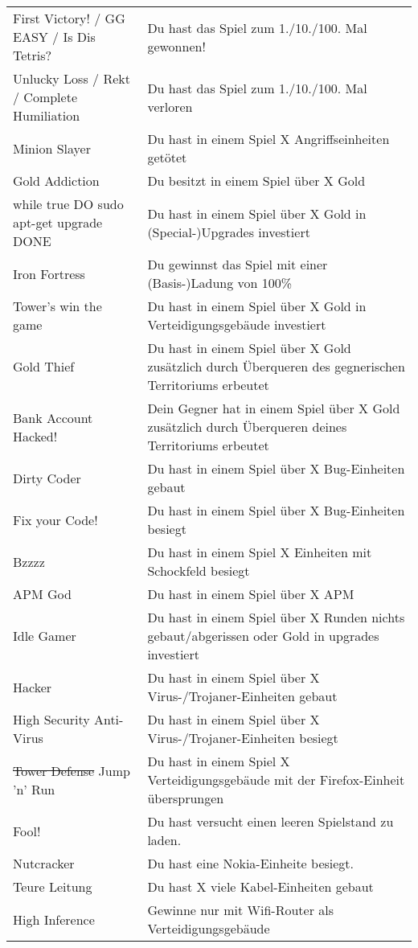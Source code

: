 \begin{table}[ht]
\begin{longtabu}{X[-1]X}
    First Victory! / GG EASY / Is Dis Tetris?
      & Du hast das Spiel zum 1./10./100. Mal gewonnen!
      	\\
    Unlucky Loss / Rekt / Complete Humiliation
    	& Du hast das Spiel zum 1./10./100. Mal verloren
    	\\
	Minion Slayer
		& Du hast in einem Spiel X Angriffseinheiten getötet
		\\
	Gold Addiction
		& Du besitzt in einem Spiel über X Gold
		\\
	while true DO sudo apt-get upgrade DONE
		& Du hast in einem Spiel über X Gold in (Special-)Upgrades investiert
		\\
	Iron Fortress
		& Du gewinnst das Spiel mit einer (Basis-)Ladung von 100\%
		\\
	Tower's win the game
		& Du hast in einem Spiel über X Gold in Verteidigungsgebäude investiert
		\\
	Gold Thief
		& Du hast in einem Spiel über X Gold zusätzlich durch Überqueren des gegnerischen
		Territoriums erbeutet
		\\
	Bank Account Hacked!
		& Dein Gegner hat in einem Spiel über X Gold zusätzlich durch Überqueren deines
		Territoriums erbeutet
		\\
	Dirty Coder
		& Du hast in einem Spiel über X Bug-Einheiten gebaut
		\\
	Fix your Code!
		& Du hast in einem Spiel über X Bug-Einheiten besiegt
		\\
	Bzzzz
		& Du hast in einem Spiel X Einheiten mit Schockfeld besiegt
		\\
	APM God
		& Du hast in einem Spiel über X APM
		\\
	Idle Gamer
		& Du hast in einem Spiel über X Runden nichts gebaut/abgerissen oder Gold in upgrades investiert
		\\
	Hacker
		& Du hast in einem Spiel über X Virus-/Trojaner-Einheiten gebaut
		\\
	High Security Anti-Virus
		& Du hast in einem Spiel über X Virus-/Trojaner-Einheiten besiegt
		\\
	\st{Tower Defense} Jump 'n' Run
		& Du hast in einem Spiel X Verteidigungsgebäude mit der Firefox-Einheit übersprungen
		\\
	Fool!
		& Du hast versucht einen leeren Spielstand zu laden.
		\\
	Nutcracker
		& Du hast eine Nokia-Einheite besiegt.
		\\
	Teure Leitung
		& Du hast X viele Kabel-Einheiten gebaut
		\\
	High Inference
		& Gewinne nur mit Wifi-Router als Verteidigungsgebäude
		\\
    \bottomrule
  \end{longtabu}
\end{table}
